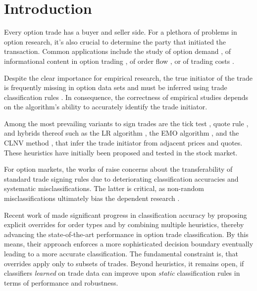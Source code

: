 \section{Introduction}\label{sec:introduction}

Every option trade has a buyer and seller side. For a plethora of problems in option research, it’s also crucial to determine the party that initiated the transaction. Common applications include the study of option demand \autocite[][4261]{garleanuDemandBasedOptionPricing2009}, of informational content in option trading \autocites[][631]{huDoesOptionTrading2014}[][882]{panInformationOptionVolume2006}[][1079]{caoInformationalContentOption2005}, of order flow \autocite[][684]{muravyevOrderFlowExpected2016}, or of trading costs \autocite[][4980]{muravyevOptionsTradingCosts2020}. 

Despite the clear importance for empirical research, the true initiator of the trade is frequently missing in option data sets and must be inferred using trade classification rules \autocite[][453]{easleyOptionVolumeStock1998}. In consequence, the correctness of empirical studies depends on the algorithm's ability to accurately identify the trade initiator.

Among the most prevailing variants to sign trades are the tick test \autocite[][240]{hasbrouckTradesQuotesInventories1988}, quote rule \autocite[][41]{harrisDayEndTransactionPrice1989}, and hybrids thereof such as the \gls{LR} algorithm \autocite[][745]{leeInferringTradeDirection1991}, the \gls{EMO} algorithm \autocite[][536]{ellisAccuracyTradeClassification2000}, and the \gls{CLNV} method \autocite[][3812]{chakrabartyTradeClassificationAlgorithms2007}, that infer the trade initiator from adjacent prices and quotes. These heuristics have initially been proposed and tested in the stock market.

For option markets, the works of \textcites[][11--13]{grauerOptionTradeClassification2022}[][887--891]{savickasInferringDirectionOption2003} raise concerns about the transferability of standard trade signing rules due to deteriorating classification accuracies and systematic misclassifications. The latter is critical, as non-random misclassifications ultimately bias the dependent research \autocites[][260]{odders-whiteOccurrenceConsequencesInaccurate2000}[][157]{theissenTestAccuracyLee2001}.

Recent work of \textcite[][13--16]{grauerOptionTradeClassification2022} made significant progress in classification accuracy by proposing explicit overrides for order types and by combining multiple heuristics, thereby advancing the state-of-the-art performance in option trade classification. By this means, their approach enforces a more sophisticated decision boundary eventually leading to a more accurate classification. The fundamental constraint is, that overrides apply only to subsets of trades. Beyond heuristics, it remains open, if classifiers \emph{learned} on trade data can improve upon \emph{static} classification rules in terms of performance and robustness.

